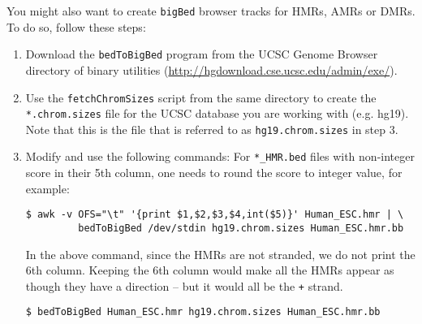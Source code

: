 \documentclass[10pt]{article}
\newcommand{\prog}[1]{\texttt{#1}}
\newcommand{\fn}[1]{\texttt{#1}}
\newcommand{\lit}[1]{\texttt{#1}}
\begin{document}
\noindent
You might also want to create \fn{bigBed} browser tracks for HMRs,
AMRs or DMRs. To do so, follow these steps:
\begin{enumerate}
\item Download the \prog{bedToBigBed} program from the UCSC Genome
  Browser directory of binary utilities
  (\url{http://hgdownload.cse.ucsc.edu/admin/exe/}).
\item Use the \fn{fetchChromSizes} script from the same directory to
  create the \fn{*.chrom.sizes} file for the UCSC database you are
  working with (e.g. hg19). Note that this is the file that is
  referred to as \fn{hg19.chrom.sizes} in step 3.
\item Modify and use the following commands: For \fn{*\_HMR.bed} files
  with non-integer score in their 5th column, one needs to round the
  score to integer value, for example:
\begin{verbatim}
$ awk -v OFS="\t" '{print $1,$2,$3,$4,int($5)}' Human_ESC.hmr | \
         bedToBigBed /dev/stdin hg19.chrom.sizes Human_ESC.hmr.bb
\end{verbatim}
  In the above command, since the HMRs are not stranded, we do not
  print the 6th column. Keeping the 6th column would make all the HMRs
  appear as though they have a direction -- but it would all be the
  \lit{+} strand.
\begin{verbatim}
$ bedToBigBed Human_ESC.hmr hg19.chrom.sizes Human_ESC.hmr.bb
\end{verbatim}
\end{enumerate}


\end{document}
